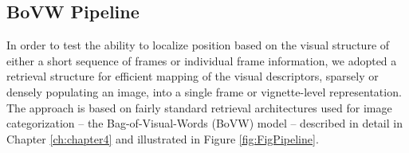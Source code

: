 %
%
%
%
%

\subsection{BoVW Pipeline}
In order to test the ability to localize position based on the visual structure of either a short sequence of frames or individual frame information, we adopted a retrieval structure for efficient mapping of the visual descriptors, sparsely or densely populating an image,  into a single frame or vignette-level representation.  The approach is based on fairly standard retrieval architectures used for image categorization -- the Bag-of-Visual-Words (BoVW) model -- described in detail in Chapter \ref{ch:chapter4} and illustrated in Figure \ref{fig:FigPipeline}.


